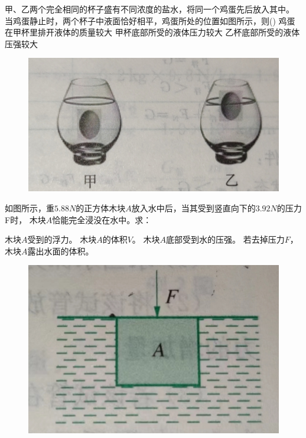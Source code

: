 \documentclass[a4paper,cs4size]{BHCexam}
\begin{document}
\begin{groups}
\begin{questions}[]
        \question[5] 甲、乙两个完全相同的杯子盛有不同浓度的盐水，将同一个鸡蛋先后放入其中。
        当鸡蛋静止时，两个杯子中液面恰好相平，鸡蛋所处的位置如图所示，则(\quad\quad\quad\quad)
        {鸡蛋在甲杯里排开液体的质量较大}
        {甲杯底部所受的液体压力较大}
        {乙杯底部所受的液体压强较大}
        \begin{figure}[htb]
            \flushright
            \includegraphics [scale=0.4,trim=0 0 0 0]{./image/pyhsics_buoyantforce_2.png}
            \label{fig:fig_buoyantforce_2.png}
        \end{figure}
        \vspace{0.5cm}

        \question[5] 如图所示，重$5.88N$的正方体木块$A$放入水中后，当其受到竖直向下的$3.92N$的压力F时，
        木块$A$恰能完全浸没在水中。求：
        \begin{subquestions}
            \subquestion 木块$A$受到的浮力。
            \subquestion 木块$A$的体积$V$。
            \subquestion 木块$A$底部受到水的压强。
            \subquestion 若去掉压力$F$，木块$A$露出水面的体积。
        \end{subquestions}
        \begin{figure}[htb]
            \flushright
            \includegraphics [scale=0.4,trim=0 0 0 0]{./image/pyhsics_buoyantforce_3.png}
            \label{fig:fig_buoyantforce_3.png}
        \end{figure}
        \vspace{5cm}


\end{questions}
\end{groups}
\end{document}
